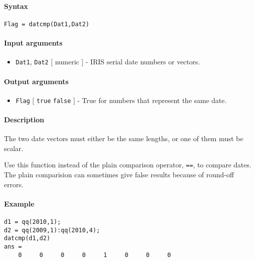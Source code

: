 


	\paragraph{Syntax}\label{syntax}

\begin{verbatim}
Flag = datcmp(Dat1,Dat2)
\end{verbatim}

\paragraph{Input arguments}\label{input-arguments}

\begin{itemize}
\itemsep1pt\parskip0pt
\item
  \texttt{Dat1}, \texttt{Dat2} {[} numeric {]} - IRIS serial date
  numbers or vectors.
\end{itemize}

\paragraph{Output arguments}\label{output-arguments}

\begin{itemize}
\itemsep1pt\parskip0pt
\item
  \texttt{Flag} {[} \texttt{true} \textbar{} \texttt{false} {]} - True
  for numbers that represent the same date.
\end{itemize}

\paragraph{Description}\label{description}

The two date vectors must either be the same lengths, or one of them
must be scalar.

Use this function instead of the plain comparison operator, \texttt{==},
to compare dates. The plain comparision can sometimes give false results
because of round-off errors.

\paragraph{Example}\label{example}

\begin{verbatim}
d1 = qq(2010,1);
d2 = qq(2009,1):qq(2010,4);
datcmp(d1,d2)
ans =
    0     0     0     0     1     0     0     0
\end{verbatim}


